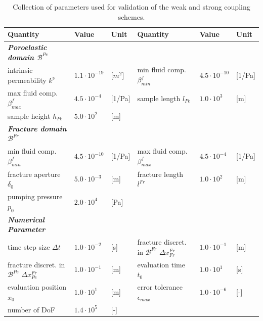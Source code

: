 \begin{table}[htb]
\centering
\begin{adjustbox}{max width=\textwidth}
\begin{tabular}{llllll}\hline
\rule[1.9ex]{0ex}{1ex}\bf{Quantity} & \bf{Value} & \bf{Unit} & \bf{Quantity} & \bf{Value} & \bf{Unit} \\[1.1ex]\hline
\textbf{\textit{Poroelastic domain $\mathcal{B}^{Pe}$}} &&&&&  \\
intrinsic permeability $k^\mathfrak{s}$ & $1.1\cdot10^{-19}$ & [$m^2$] & min fluid comp. $\beta^f_{min}$  & $4.5\cdot10^{-10}$ & [1/Pa]  \\
max fluid comp. $\beta^f_{max}$  & $4.5\cdot10^{-4}  $ & [1/Pa] & 
sample length $l_{{Pe}}$ & $1.0\cdot10^3$ & [m] \\ 
sample height $h_{{Pe}}$ & $5.0 \cdot 10^2$ & [m] &&&\\
\textbf{\textit{Fracture domain $\mathcal{B}^{{Fr}}$}} &&&&&  \\
min fluid comp. $\beta^f_{min}$  & $4.5\cdot10^{-10} $ & [1/Pa] & max fluid comp. $\beta^f_{max}$  & $4.5\cdot10^{-4}  $ & [1/Pa] \\ 
fracture aperture $\delta_0$ & $5.0\cdot10^{-3}$ & [m] & fracture length $l^{Fr}$ & $1.0 \cdot 10^2$ & [m] \\
pumping pressure $p_0$ & $2.0\cdot10^4$ & [Pa] &  &  & \\
\textbf{\textit{Numerical Parameter}} &&&&&  \\
time step size $\Delta t$ & $1.0\cdot10^{-2}$ & [s] &
fracture discret. in $\mathcal{B}^{Fr}$ $\Delta x^{Fr}_{Fr}$ & $1.0\cdot10^{-1}$ & [m] \\
fracture discret. in $\mathcal{B}^{Pe}$ $\Delta x^{Fr}_{Pe}$ & $1.0\cdot10^{-1}$ & [m] &
evaluation time $t_0$ & $1.0 \cdot 10^1$ & [s] \\
evaluation position $x_0$ & $1.0 \cdot 10^1$ & [m] & error tolerance $\epsilon_{max}$ & $1.0 \cdot 10^{-6}$ & [-] \\
number of DoF & $1.4 \cdot 10^5$ & [-]& & & \\
\hline
\end{tabular}
\end{adjustbox}
\caption{Collection of parameters used for validation of the weak and strong coupling schemes.}
\label{tab:validationparameters}
\end{table}

